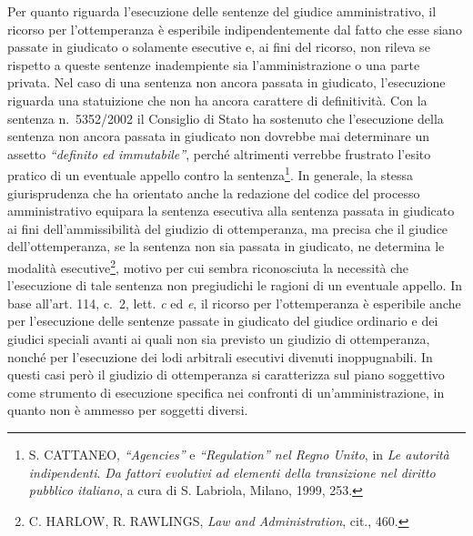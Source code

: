 \documentclass[12pt,it,a4paper,]{report}
\begin{document}
Per quanto riguarda l'esecuzione delle sentenze del giudice
amministrativo, il ricorso per l'ottemperanza è esperibile
indipendentemente dal fatto che esse siano passate in giudicato o
solamente esecutive e, ai fini del ricorso, non rileva se rispetto a
queste sentenze inadempiente sia l'amministrazione o una parte privata.
Nel caso di una sentenza non ancora passata in giudicato, l'esecuzione
riguarda una statuizione che non ha ancora carattere di definitività.
Con la sentenza n.~5352/2002 il Consiglio di Stato ha sostenuto che
l'esecuzione della sentenza non ancora passata in giudicato non dovrebbe
mai determinare un assetto \emph{``definito ed immutabile''}, perché
altrimenti verrebbe frustrato l'esito pratico di un eventuale appello
contro la sentenza\footnote{S. CATTANEO, \emph{``Agencies''} e
  \emph{``Regulation'' nel Regno Unito}, in \emph{Le autorità
  indipendenti}. \emph{Da fattori evolutivi ad elementi della
  transizione nel diritto pubblico italiano}, a cura di S. Labriola,
  Milano, 1999, 253.}. In generale, la stessa giurisprudenza che ha
orientato anche la redazione del codice del processo amministrativo
equipara la sentenza esecutiva alla sentenza passata in giudicato ai
fini dell'ammissibilità del giudizio di ottemperanza, ma precisa che il
giudice dell'ottemperanza, se la sentenza non sia passata in giudicato,
ne determina le modalità esecutive\footnote{C. HARLOW, R. RAWLINGS,
  \emph{Law and Administration}, cit., 460.}, motivo per cui sembra
riconosciuta la necessità che l'esecuzione di tale sentenza non
pregiudichi le ragioni di un eventuale appello. In base all'art. 114,
c.~2, lett. \emph{c} ed \emph{e}, il ricorso per l'ottemperanza è
esperibile anche per l'esecuzione delle sentenze passate in giudicato
del giudice ordinario e dei giudici speciali avanti ai quali non sia
previsto un giudizio di ottemperanza, nonché per l'esecuzione dei lodi
arbitrali esecutivi divenuti inoppugnabili. In questi casi però il
giudizio di ottemperanza si caratterizza sul piano soggettivo come
strumento di esecuzione specifica nei confronti di un'amministrazione,
in quanto non è ammesso per soggetti diversi.
\end{document}

